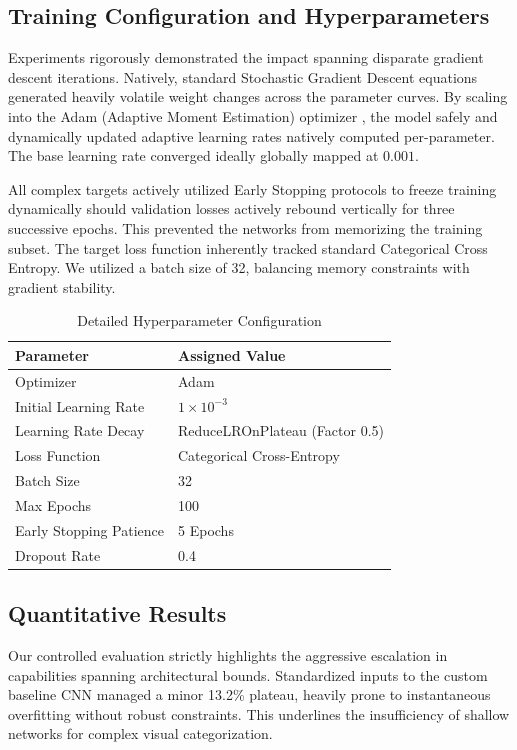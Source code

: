 \documentclass[conference]{IEEEtran}
\begin{document}
\subsection{Training Configuration and Hyperparameters}
Experiments rigorously demonstrated the impact spanning disparate gradient descent iterations. Natively, standard Stochastic Gradient Descent equations generated heavily volatile weight changes across the parameter curves. By scaling into the Adam (Adaptive Moment Estimation) optimizer \cite{b10}, the model safely and dynamically updated adaptive learning rates natively computed per-parameter. The base learning rate converged ideally globally mapped at $0.001$. 

All complex targets actively utilized Early Stopping protocols to freeze training dynamically should validation losses actively rebound vertically for three successive epochs. This prevented the networks from memorizing the training subset. The target loss function inherently tracked standard Categorical Cross Entropy. We utilized a batch size of 32, balancing memory constraints with gradient stability.

\begin{table}[htbp]
\caption{Detailed Hyperparameter Configuration}
\begin{center}
\begin{tabular}{@{}ll@{}}
\toprule
\textbf{Parameter} & \textbf{Assigned Value} \\
\midrule
Optimizer & Adam \\
Initial Learning Rate & $1 \times 10^{-3}$ \\
Learning Rate Decay & ReduceLROnPlateau (Factor 0.5) \\
Loss Function & Categorical Cross-Entropy \\
Batch Size & 32 \\
Max Epochs & 100 \\
Early Stopping Patience & 5 Epochs \\
Dropout Rate & 0.4 \\
\bottomrule
\end{tabular}
\label{tab_hyper}
\end{center}
\end{table}

\subsection{Quantitative Results}
Our controlled evaluation strictly highlights the aggressive escalation in capabilities spanning architectural bounds. Standardized inputs to the custom baseline CNN managed a minor 13.2\% plateau, heavily prone to instantaneous overfitting without robust constraints. This underlines the insufficiency of shallow networks for complex visual categorization.
\end{document}
